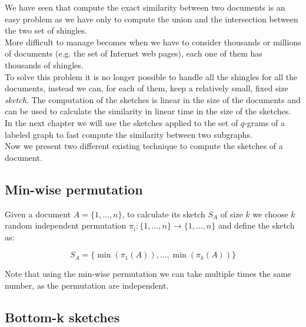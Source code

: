 We have seen that compute the exact similarity between two documents is an easy problem
as we have only to compute the union and the intersection between the two set of shingles.\\

More difficult to manage becomes when we have to consider thousands or millions of documents
(e.g. the set of Internet web pages), each one of them has thousands of shingles.\\

To solve this problem it is no longer possible to handle all the shingles for all the documents, 
instead we can, for each of them, keep a relatively small, fixed size \textit{sketch}.
The computation of the sketches is linear in the size of the documents and can be used to calculate
the similarity in linear time in the size of the sketches.\\

In the next chapter we will use the sketches applied to the set of $q$-grams of a labeled graph to 
fast compute the similarity between two subgraphs.\\

Now we present two different existing technique to compute the sketches of a document.

\subsection*{Min-wise permutation}

Given a document $A = \{1, \ldots, n\}$, to calculate its sketch $S_{A}$ of size $k$ 
we choose $k$ random independent permutation $\pi_{i} : \{1, \ldots, n\} \rightarrow \{1, \ldots, n\}$ and define the sketch as:

\begin{equation*}
	S_{A} = \{ \min(\pi_{1}(A)), \ldots, \min(\pi_{k}(A)) \}
\end{equation*}

Note that using the min-wise permutation we can take multiple times the same number, as the permutation are independent.

\subsection*{Bottom-k sketches}

